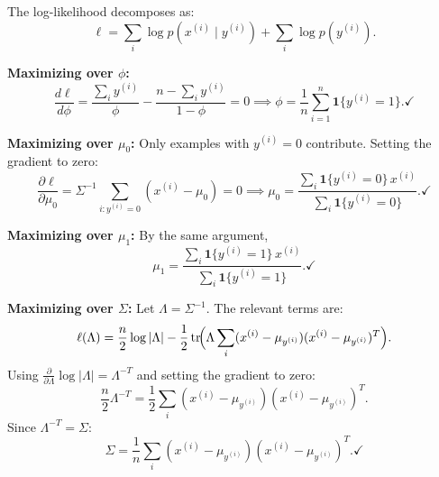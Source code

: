 \begin{answer}
The log-likelihood decomposes as:
\[
\ell = \sum_i \log p(x^{(i)}\mid y^{(i)}) + \sum_i \log p(y^{(i)}).
\]

\textbf{Maximizing over $\phi$:}
\[
\frac{d\ell}{d\phi} = \frac{\sum_i y^{(i)}}{\phi} - \frac{n - \sum_i y^{(i)}}{1-\phi} = 0
\implies \phi = \frac{1}{n}\sum_{i=1}^n \mathbf{1}\{y^{(i)}=1\}. \checkmark
\]

\textbf{Maximizing over $\mu_0$:}
Only examples with $y^{(i)}=0$ contribute. Setting the gradient to zero:
\[
\frac{\partial \ell}{\partial \mu_0} = \Sigma^{-1}\sum_{i:y^{(i)}=0}(x^{(i)}-\mu_0) = 0
\implies \mu_0 = \frac{\sum_i \mathbf{1}\{y^{(i)}=0\}\,x^{(i)}}{\sum_i \mathbf{1}\{y^{(i)}=0\}}. \checkmark
\]

\textbf{Maximizing over $\mu_1$:} By the same argument,
\[
\mu_1 = \frac{\sum_i \mathbf{1}\{y^{(i)}=1\}\,x^{(i)}}{\sum_i \mathbf{1}\{y^{(i)}=1\}}. \checkmark
\]

\textbf{Maximizing over $\Sigma$:} Let $\Lambda = \Sigma^{-1}$. The relevant terms are:
\[
\ell(\Lambda) = \frac{n}{2}\log|\Lambda| - \frac{1}{2}\operatorname{tr}\!\Bigl(\Lambda \sum_i (x^{(i)}-\mu_{y^{(i)}})(x^{(i)}-\mu_{y^{(i)}})^T\Bigr).
\]
Using $\frac{\partial}{\partial\Lambda}\log|\Lambda| = \Lambda^{-T}$ and setting the gradient to zero:
\[
\frac{n}{2}\Lambda^{-T} = \frac{1}{2}\sum_i (x^{(i)}-\mu_{y^{(i)}})(x^{(i)}-\mu_{y^{(i)}})^T.
\]
Since $\Lambda^{-T} = \Sigma$:
\[
\Sigma = \frac{1}{n}\sum_i (x^{(i)}-\mu_{y^{(i)}})(x^{(i)}-\mu_{y^{(i)}})^T. \checkmark
\]
\end{answer}
